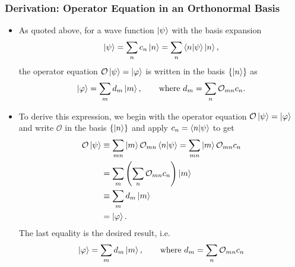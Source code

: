 \documentclass[11pt, a4paper]{article}
\renewcommand{\O}{\mathcal{O}}  %
\newcommand{\p}{\psi}  %
\begin{document}
\subsubsection{Derivation: Operator Equation in an Orthonormal Basis}
\begin{itemize}
    \item As quoted above, for a wave function $ \ket{\psi} $ with the basis expansion
	\begin{equation*}
		\ket{\psi} = \sum_{n}c_{n} \ket{n} = \sum_{n} \braket{n}{\psi} \ket{n},
	\end{equation*}
    the operator equation $ \O \ket{\psi} = \ket{\varphi} $ is written in the basis $ \{\ket{n}\} $ as
    \begin{equation*}
        \ket{\varphi} = \sum_{m}d_{m}\ket{m}, \qquad \text{where } d_{m} = \sum_{n} \O_{mn} c_{n}.
    \end{equation*}
	
    \item To derive this expression, we begin with the operator equation $ \O \ket{\psi} = \ket{\varphi} $ and write $ \O $ in the basis $ \{\ket{n}\} $ and apply $ c_{n} = \bra{n} \ket{\psi} $ to get
	\begin{align*}
		\O \ket{\p} &\equiv \sum_{mn}\ket{m}\O_{mn}\bra{n}  \ket{\psi} = \sum_{mn}\ket{m} \O_{mn}  c_{n}\\
		& = \sum_{m}\left(\sum_{n}\O_{mn}c_{n}\right) \ket{m} \\
		& \equiv \sum_{m}d_{m}\ket{m} \\
		& = \ket{\varphi}.
	\end{align*}
    The last equality is the desired result, i.e.
	\begin{equation*}
		\ket{\varphi} = \sum_{m} d_{m}\ket{m}, \qquad \text{where } d_{m} = \sum_{n}\O_{mn} c_{n}
	\end{equation*}
	
\end{itemize}
\end{document}
